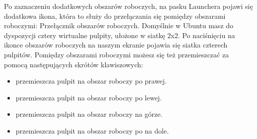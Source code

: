 Po zaznaczeniu dodatkowych obszarów roboczych, na pasku Launchera pojawi się dodatkowa ikona, która to służy do przełączania się pomiędzy obszarami roboczymi: \textcolor{ubuntu_orange}{Przełącznik obszarów roboczych}.
\clearpage
Domyślnie w Ubuntu masz do dyspozycji cztery wirtualne pulpity, ułożone w siatkę 2x2. Po naciśnięciu na ikonce obszarów roboczych na naszym ekranie pojawia się siatka czterech pulpitów. Pomiędzy obszarami roboczymi możesz się też przemieszczać za pomocą następujących skrótów klawiszowych:
\begin{itemize}
\item {} przemieszcza pulpit na obszar roboczy po prawej.
\item {} przemieszcza pulpit na obszar roboczy po lewej.
\item {} przemieszcza pulpit na obszar roboczy na górze.
\item {} przemieszcza pulpit na obszar roboczy po na dole.
\end{itemize}